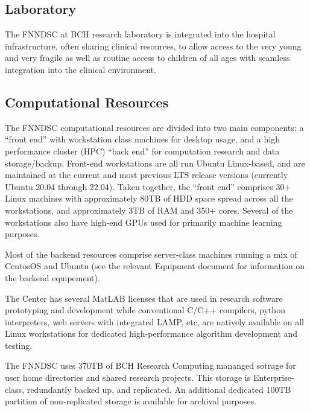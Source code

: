 \documentclass[11pt]{amsart}
\begin{document}
\hypertarget{x-laboratory}{\subsection*{Laboratory}}
The FNNDSC at BCH research laboratory is integrated into the hospital infrastructure, often sharing clinical resources, to allow access to the very young and very fragile as well as routine access to children of all ages with seamless integration into the clinical environment.


\hypertarget{x-computational-resources}{\subsection*{Computational Resources}}
The FNNDSC computational resources are divided into two main components: a “front end” with workstation class machines for desktop usage, and a high performance cluster (HPC) “back end” for computation research and data storage/backup. Front-end workstations are all run Ubuntu Linux-based, and are maintained at the current and most previous LTS release versions (currently Ubuntu 20.04 through 22.04). Taken together, the “front end” comprises 30+ Linux machines with approximately 80TB of HDD space spread across all the workstations, and approximately 3TB of RAM and 350+ cores. Several of the workstations also have high-end GPUs used for primarily machine learning purposes.


Most of the backend resources comprise server-class machines running a mix of CentosOS and Ubuntu (see the relevant Equipment document for information on the backend equipement).


The Center has several MatLAB licenses that are used in research software prototyping and development while conventional C/C++ compilers, python interpreters, web servers with integrated LAMP, etc, are natively available on all Linux workstations for dedicated high-performance algorithm development and testing.


The FNNDSC uses 370TB of BCH Research Computing mananged sotrage for user home directories and shared research projects. This storage is Enterprise-class, redundantly backed up, and replicated. An additional dedicated 100TB partition of non-replicated storage is available for archival purposes.
\end{document}
